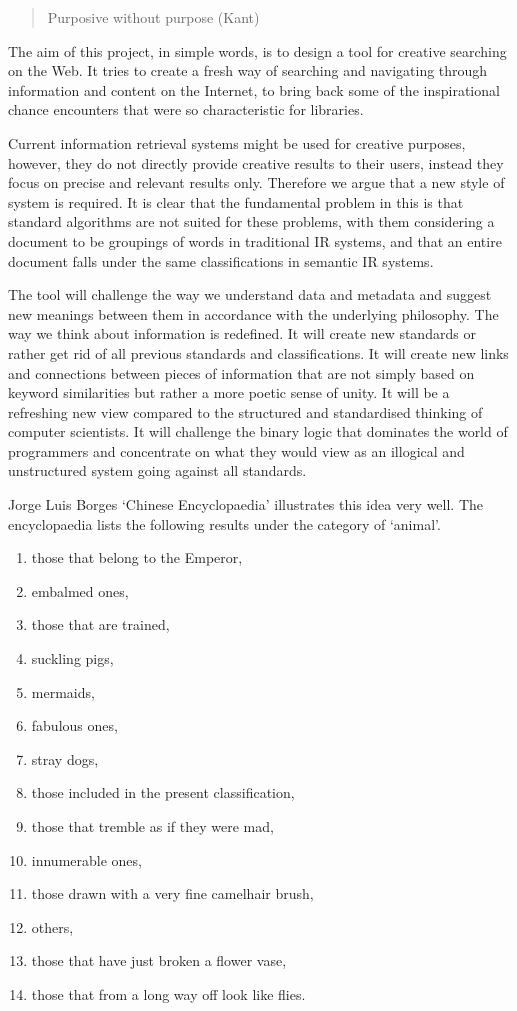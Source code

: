 \begin{quote}
  Purposive without purpose (Kant)
\end{quote}

The aim of this project, in simple words, is to design a tool for creative searching on the Web. It tries to create a fresh way of searching and navigating through information and content on the Internet, to bring back some of the inspirational chance encounters that were so characteristic for libraries.

Current information retrieval systems might be used for creative purposes, however, they do not directly provide creative results to their users, instead they focus on precise and relevant results only. Therefore we argue that a new style of system is required. It is clear that the fundamental problem in this is that standard algorithms are not suited for these problems, with them considering a document to be groupings of words in traditional IR systems, and that an entire document falls under the same classifications in semantic IR systems.

The tool will challenge the way we understand data and metadata and suggest new meanings between them in accordance with the underlying philosophy. The way we think about information is redefined. It will create new standards or rather get rid of all previous standards and classifications. It will create new links and connections between pieces of information that are not simply based on keyword similarities but rather a more poetic sense of unity. It will be a refreshing new view compared to the structured and standardised thinking of computer scientists. It will challenge the binary logic that dominates the world of programmers and concentrate on what they would view as an illogical and unstructured system going against all standards.

Jorge Luis Borges `Chinese Encyclopaedia' \citep{Borges2000} illustrates this idea very well. The encyclopaedia lists the following results under the category of `animal'.

\begin{enumerate}
  \item those that belong to the Emperor,
  \item embalmed ones,
  \item those that are trained,
  \item suckling pigs,
  \item mermaids,
  \item fabulous ones,
  \item stray dogs,
  \item those included in the present classification,
  \item those that tremble as if they were mad,
  \item innumerable ones,
  \item those drawn with a very fine camelhair brush,
  \item others,
  \item those that have just broken a flower vase,
  \item those that from a long way off look like flies.
\end{enumerate}

